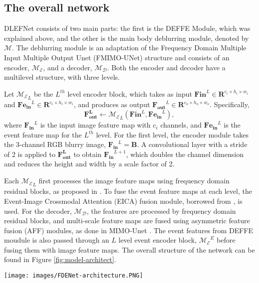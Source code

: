 \documentclass{article}
\begin{document}
\subsection{The overall network}
DLEFNet consists of two main parts: the first is the DEFFE Module, which was explained above, and the other is the main body deblurring module, denoted by $\mathcal{M}$. The deblurring module is an adaptation of the Frequency Domain Multiple Input Multiple Output Unet (FMIMO-UNet) structure and consists of an encoder, $\mathcal{M_E}$, and a decoder, $\mathcal{M_D}$. Both the encoder and decoder have a multilevel structure, with three levels.

Let $\mathcal{M_E}_L$ be the $L^{th}$ level encoder block, which takes as input $\mathbf{F{in}}^L \in \mathbf{R} ^{c_i \times h_i \times w_i }$ and $\mathbf{Fe_{in}}^L \in \mathbf{R} ^{c_i \times h_i \times w_i }$, and produces as output $\mathbf{F_{out}}^L \in \mathbf{R} ^{c_o \times h_o \times w_o }$. Specifically,
\begin{equation}
\mathbf{F_{out}^L} \leftarrow \mathcal{M_E}_L \left ( \mathbf{F{in}}^L, \mathbf{Fe_{in}}^L \right ),
\end{equation}
where $\mathbf{F_{in}}^L$ is the input image feature map with $c_i$ channels, and $\mathbf{Fe_{in}}^L$ is the event feature map for the $L^{th}$ level. 
For the first level, the encoder module takes the 3-channel RGB blurry image, $\mathbf{F_{in}}^L= \mathbf{B}$. 
A convolutional layer with a stride of 2 is applied to $\mathbf{F_{out}^L}$ to obtain $\mathbf{F_{in}}^{L+1}$, which doubles the channel dimension and 
reduces the height and width by a scale factor of 2. 

Each $\mathcal{M_E}_L$ first processes the image feature maps using frequency domain residual blocks, 
as proposed in \cite{DeepRFT}. 
To fuse the event feature maps at each level, the Event-Image Crossmodal Attention (EICA) fusion module, 
borrowed from \cite{EFNet}, is used. For the decoder, $\mathcal{M_D}$, the features are processed by 
frequency domain residual blocks, and multi-scale feature maps are fused using asymmetric feature 
fusion (AFF) modules, as done in MIMO-Unet \cite{MIMO}. The event features from DEFFE moudule is also passed through an $L$ level event encoder block, 
$\mathcal{M_E}^E$ before fusing them with image feature maps. The overall structure of the network can be 
found in Figure \ref{fig:model-architect}.

\begin{figure*}[ht]
\centering
\texttt{[image: images/FDENet-architecture.PNG]}
\caption{The pipeline of the proposed DLEFNet}
\label{fig:model-architect}
\end{figure*}
\end{document}
